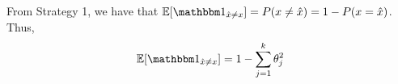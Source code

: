 \documentclass[a4paper]{article}
\theoremstyle{definition}
\def\E{\mathbb E}
\def\ind{\mathbbm 1}
\begin{document}
From Strategy 1, we have that $\E[\ind_{\hat x \neq x}] = P(x \neq \hat x) = 1 - P(x = \hat x)$.
Thus, $$\E[\ind_{\hat x \neq x}] = 1 - \sum_{j=1}^{k}{\theta_{j}^2}$$



\newpage
\end{document}
